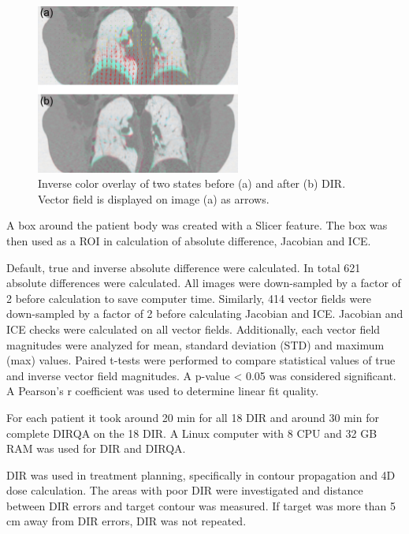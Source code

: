 \documentclass[type=dr, dr=rernat, accentcolor=tud7b,colorbacktitle, bigchapter, openright, twoside, 12pt ]{tudthesis}
\begin{document}
\begin{figure}[H]
	\begin{center}		
		\includegraphics[width=0.6\textwidth]{./Images/exampleReg.png}
		\caption{Inverse color overlay of two states before (a) and after (b) DIR. Vector field is displayed on image (a) as arrows.}
		\label{exampleReg_lung}
	\end{center}
\end{figure}

A box around the patient body was created with a Slicer feature. The box was then used as a ROI in calculation of absolute difference, Jacobian and ICE.

Default, true and inverse absolute difference were calculated. In total 621 absolute differences were calculated. All images were down-sampled by a factor of 2
before calculation to save computer time. Similarly, 414 vector fields were down-sampled by a factor of 2 before calculating Jacobian and ICE. Jacobian and ICE checks were calculated on all vector fields.
Additionally, each vector field magnitudes were analyzed for mean, standard deviation (STD) and maximum (max) values. Paired t-tests were performed to compare statistical values of true and inverse vector field magnitudes.
A p-value < 0.05 was considered significant. A Pearson's r coefficient was used to determine linear fit quality.


For each patient it took around 20 min for all 18 DIR and around 30 min for complete DIRQA on the 18 DIR. A Linux computer with 8 CPU and 32 GB RAM was used for DIR and DIRQA.

DIR was used in treatment planning, specifically in contour propagation and 4D dose calculation. The areas with poor DIR were investigated and distance between DIR errors 
and target contour was measured. If target was more than 5 cm away from DIR errors, DIR was not repeated.
\end{document}
